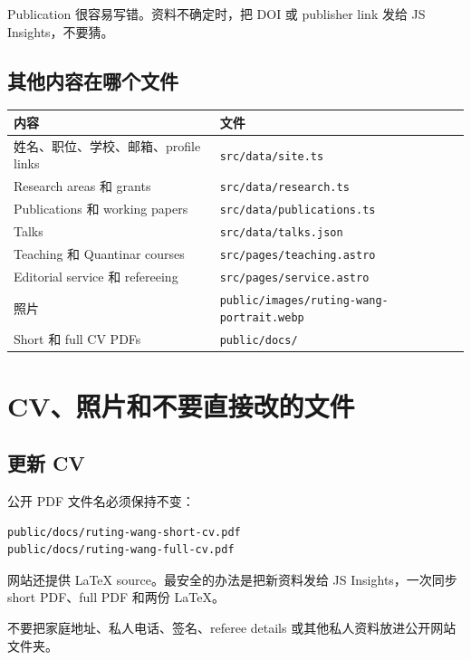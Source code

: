 \documentclass[10pt,a4paper]{article}
\begin{document}
\begin{tcolorbox}[alert]
Publication 很容易写错。资料不确定时，把 DOI 或 publisher link 发给 JS Insights，不要猜。
\end{tcolorbox}

\subsection{其他内容在哪个文件}

\begin{tabularx}{\linewidth}{Y L{72mm}}
\toprule
\textbf{内容} & \textbf{文件}\\
\midrule
姓名、职位、学校、邮箱、profile links & \texttt{src/data/site.ts}\\
Research areas 和 grants & \texttt{src/data/research.ts}\\
Publications 和 working papers & \texttt{src/data/publications.ts}\\
Talks & \texttt{src/data/talks.json}\\
Teaching 和 Quantinar courses & \texttt{src/pages/teaching.astro}\\
Editorial service 和 refereeing & \texttt{src/pages/service.astro}\\
照片 & \texttt{public/images/ruting-wang-portrait.webp}\\
Short 和 full CV PDFs & \texttt{public/docs/}\\
\bottomrule
\end{tabularx}

\clearpage
\section{CV、照片和不要直接改的文件}

\subsection{更新 CV}

公开 PDF 文件名必须保持不变：

\begin{lstlisting}
public/docs/ruting-wang-short-cv.pdf
public/docs/ruting-wang-full-cv.pdf
\end{lstlisting}

网站还提供 LaTeX source。最安全的办法是把新资料发给 JS Insights，一次同步 short PDF、full PDF 和两份 LaTeX。

\begin{tcolorbox}[alert]
不要把家庭地址、私人电话、签名、referee details 或其他私人资料放进公开网站文件夹。
\end{tcolorbox}
\end{document}
